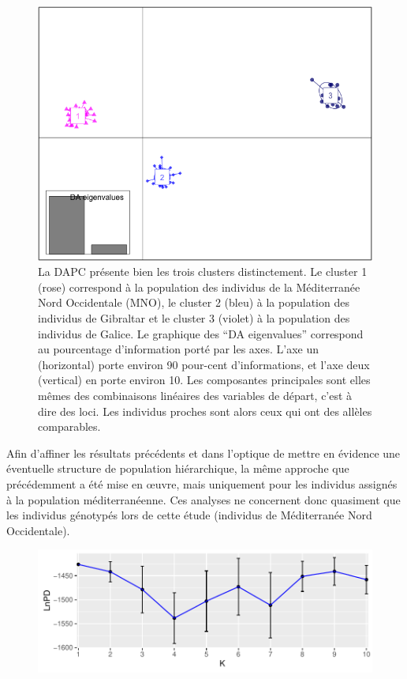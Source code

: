 \documentclass[a4paper,12pt,twoside]{article}\usepackage[]{graphicx}\usepackage[]{color}
\makeatletter
\def\maxwidth{ %
  \ifdim\Gin@nat@width>\linewidth
    \linewidth
  \else
    \Gin@nat@width
  \fi
}
\makeatother
\begin{document}
\begin {bibunit} [newbst]
\begin{figure}[htbp]
	\centering
		\includegraphics[width=.7\textwidth]{DAPC}
	\caption[DAPC]{La DAPC présente bien les trois clusters distinctement. Le cluster 1 (rose) correspond à la population des individus de la Méditerranée Nord Occidentale (MNO), le cluster 2 (bleu) à la population des individus de Gibraltar et le cluster 3 (violet) à la population des individus de Galice. Le graphique des ``DA eigenvalues'' correspond au pourcentage d'information porté par les axes. L'axe un (horizontal) porte environ 90 pour-cent d'informations, et l'axe deux (vertical) en porte environ 10. Les composantes principales sont elles mêmes des combinaisons linéaires des variables de départ, c'est à dire des loci. Les individus proches sont alors ceux qui ont des allèles comparables.}
	\label{fig:DAPC}
\end{figure}


Afin d'affiner les résultats précédents et dans l'optique de mettre en évidence une éventuelle structure de population hiérarchique, la même approche que précédemment a été mise en \oe uvre, mais uniquement pour les individus assignés à la population méditerranéenne. Ces analyses ne concernent donc quasiment que les individus génotypés lors de cette étude (individus de Méditerranée Nord Occidentale).

\begin{figure}[htpb]

{\centering \includegraphics[width=\maxwidth]{figure/lnpd2-1} 

}
\end{figure}
\end{bibunit}
\end{document}
